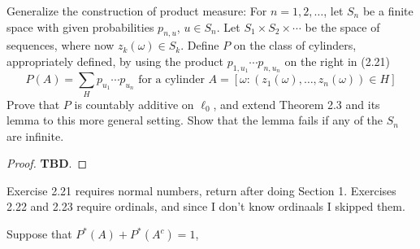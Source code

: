 \documentclass[11pt]{article}
\newcommand{\om}{\omega}
\newenvironment{exercise}[2][Exercise]{\begin{trivlist}
\item[\hskip \labelsep {\bfseries #1}\hskip \labelsep {\bfseries #2.}]}{\end{trivlist}}
\begin{document}
\begin{exercise}{2.20}
    Generalize the construction of product measure: For $n = 1, 2, \ldots$, let $S_n$ be a finite space with given probabilities $p_{n, u}$, $u \in S_n$. Let $S_1 \times S_2 \times \cdots$ be the space of sequences, where now $z_k (\om) \in S_k$. Define $P$ on the class of cylinders, appropriately defined, by using the product $p_{1, u_1} \cdots p_{n, u_n}$ on the right in (2.21)
    \[ P(A) = \sum_{H} p_{u_1} \cdots p_{u_n} \text { for a cylinder } A = [ \om : (z_1 (\om), \ldots, z_n(\om)) \in H ] \]
    Prove that $P$ is countably additive on $\ell_0$, and extend Theorem 2.3 and its lemma to this more general setting. Show that the lemma fails if any of the $S_n$ are infinite.
\end{exercise}
\begin{proof}
    \textbf{TBD}.
\end{proof}

Exercise 2.21 requires normal numbers, return after doing Section 1. Exercises 2.22 and 2.23 require ordinals, and since I don't know ordinaals I skipped them.

Suppose that $P^{\ast} (A) + P^{\ast} (A^c) = 1$, 
\end{document}
